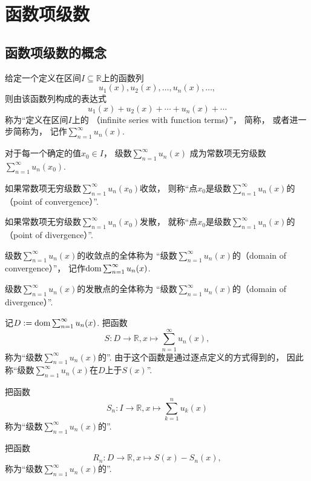 \section{函数项级数}
\subsection{函数项级数的概念}
\begin{definition}\label{definition:无穷级数.实函数项级数的概念}
给定一个定义在区间\(I \subseteq \mathbb{R}\)上的函数列\[
	u_1(x),u_2(x),\dotsc,u_n(x),\dotsc,
\]
则由该函数列构成的表达式\[
	u_1(x)+u_2(x)+\dotsb+u_n(x)+\dotsb
\]
称为“定义在区间\(I\)上的
（infinite series with function terms）”，
简称，
或者进一步简称为，
记作\(\sum_{n=1}^\infty u_n(x)\).

对于每一个确定的值\(x_0 \in I\)，
级数\(\sum_{n=1}^\infty u_n(x)\)
成为常数项无穷级数\(\sum_{n=1}^\infty u_n(x_0)\).

如果常数项无穷级数\(\sum_{n=1}^\infty u_n(x_0)\)收敛，
则称“点\(x_0\)是级数\(\sum_{n=1}^\infty u_n(x)\)的
（point of convergence）”.

如果常数项无穷级数\(\sum_{n=1}^\infty u_n(x_0)\)发散，
就称“点\(x_0\)是级数\(\sum_{n=1}^\infty u_n(x)\)的
（point of divergence）”.

级数\(\sum_{n=1}^\infty u_n(x)\)的收敛点的全体称为
“级数\(\sum_{n=1}^\infty u_n(x)\)的（domain of convergence）”，
记作\(\operatorname{dom} \sum_{n=1}^\infty u_n(x)\).

级数\(\sum_{n=1}^\infty u_n(x)\)的发散点的全体称为
“级数\(\sum_{n=1}^\infty u_n(x)\)的（domain of divergence）”.

记\(D := \operatorname{dom}\sum_{n=1}^\infty u_n(x)\).
把函数\[
	S\colon D\to\mathbb{R},
	x \mapsto \sum_{n=1}^\infty u_n(x),
\]称为“级数\(\sum_{n=1}^\infty u_n(x)\)的”.
由于这个函数是通过逐点定义的方式得到的，
因此称“级数\(\sum_{n=1}^\infty u_n(x)\)在\(D\)上于\(S(x)\)”.

把函数\[
	S_n\colon I\to\mathbb{R},
	x \mapsto \sum_{k=1}^n u_k(x)
\]称为“级数\(\sum_{n=1}^\infty u_n(x)\)的”.

把函数\[
	R_n\colon D\to\mathbb{R},
	x \mapsto S(x) - S_n(x),
\]称为“级数\(\sum_{n=1}^\infty u_n(x)\)的”.
\end{definition}

